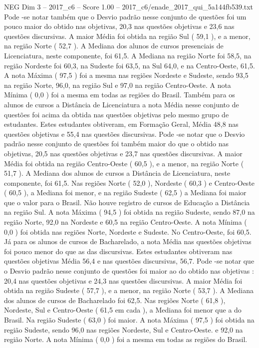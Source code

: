 \begin{textsample}{NEG Dim 3 – 2017\_c6 – Score 1.00 – 2017\_c6/enade\_2017\_qui\_5a144fb539.txt}
Pode -se notar também que o Desvio padrão nesse conjunto de questões foi um pouco maior do obtido nas objetivas, 20,3 nas questões objetivas e 23,6 nas questões discursivas.
A maior Média foi obtida na região Sul ( 59,1 ), e a menor, na região Norte ( 52,7 ).
A Mediana dos alunos de cursos presenciais de Licenciatura, neste componente, foi 61,5.
A Mediana na região Norte foi 58,5, na região Nordeste foi 60,3, na Sudeste foi 63,5, na Sul 64,0, e na Centro-Oeste, 61,5.
A nota Máxima ( 97,5 ) foi a mesma nas regiões Nordeste e Sudeste, sendo 93,5 na região Norte, 96,0, na região Sul e 97,0 na região Centro-Oeste.
A nota Mínima ( 0,0 ) foi a mesma em todas as regiões do Brasil.
Também para os alunos de cursos a Distância de Licenciatura a nota Média nesse conjunto de questões foi acima da obtida nas questões objetivas pelo mesmo grupo de estudantes.
Estes estudantes obtiveram, em Formação Geral, Média 48,8 nas questões objetivas e 55,4 nas questões discursivas.
Pode -se notar que o Desvio padrão nesse conjunto de questões foi também maior do que o obtido nas objetivas, 20,5 nas questões objetivas e 23,7 nas questões discursivas.
A maior Média foi obtida na região Centro-Oeste ( 60,5 ), e a menor, na região Norte ( 51,7 ).
A Mediana dos alunos de cursos a Distância de Licenciatura, neste componente, foi 61,5.
Nas regiões Norte ( 52,0 ), Nordeste ( 60,3 ) e Centro-Oeste ( 60,5 ), a Mediana foi menor, e na região Sudeste ( 62,5 ) a Mediana foi maior que o valor para o Brasil.
Não houve registro de cursos de Educação a Distância na região Sul.
A nota Máxima ( 94,5 ) foi obtida na região Sudeste, sendo 87,0 na região Norte, 92,0 na Nordeste e 60,5 na região Centro-Oeste.
A nota Mínima ( 0,0 ) foi obtida nas regiões Norte, Nordeste e Sudeste.
No Centro-Oeste, foi 60,5.
Já para os alunos de cursos de Bacharelado, a nota Média nas questões objetivas foi pouco menor do que as das discursivas.
Estes estudantes obtiveram nas questões objetivas Média 56,4 e nas questões discursivas, 56,7.
Pode -se notar que o Desvio padrão nesse conjunto de questões foi maior ao do obtido nas objetivas : 20,4 nas questões objetivas e 24,3 nas questões discursivas.
A maior Média foi obtida na região Sudeste ( 57,7 ), e a menor, na região Norte ( 53,7 ).
A Mediana dos alunos de cursos de Bacharelado foi 62,5.
Nas regiões Norte ( 61,8 ), Nordeste, Sul e Centro-Oeste ( 61,5 em cada ), a Mediana foi menor que a do Brasil.
Na região Sudeste ( 63,0 ) foi maior.
A nota Máxima ( 97,5 ) foi obtida na região Sudeste, sendo 96,0 nas regiões Nordeste, Sul e Centro-Oeste. e 92,0 na região Norte.
A nota Mínima ( 0,0 ) foi a mesma em todas as regiões do Brasil.

\end{textsample}
